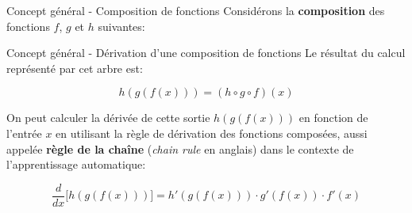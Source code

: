 \begin{frame}{Concept général - Composition de fonctions}
	Considérons la \textbf{composition} des fonctions $f$, $g$ et $h$ suivantes:
	\begin{center}
	\end{center}
\end{frame}

\begin{frame}{Concept général - Dérivation d'une composition de fonctions}
	Le résultat du calcul représenté par cet arbre est:
	
	\begin{equation*}
		h(g(f(x))) = (h \circ g \circ f)(x)
	\end{equation*}
	
	\pause
	
	On peut calculer la dérivée de cette sortie $h(g(f(x)))$ en fonction de l'entrée $x$ en utilisant la règle de dérivation des fonctions composées, aussi appelée \textbf{règle de la chaîne} (\textit{chain rule} en anglais) dans le contexte de l'apprentissage automatique:
	
	\begin{equation*}
		\frac{d}{dx} \Big[ h(g(f(x))) \Big] = h'(g(f(x))) \cdot g'(f(x)) \cdot f'(x)
	\end{equation*}
		
\end{frame}

